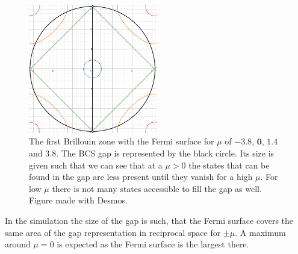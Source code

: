 \documentclass[..\main.tex]{subfile}
\begin{document}
\begin{figure}[H]
  \centering
  \includegraphics[width=0.5\textwidth]{Ressources/GapBrillouin.png}
  \caption{The first Brillouin zone with the Fermi surface for $\mu$ of \textcolor{Brillou1}{$\bm{-3.8}$}, \textcolor{Brillou2}{$\bm{0}$},
  \textcolor{Brillou3}{$\bm{1.4}$} and \textcolor{Brillou4}{$\bm{3.8}$}. The BCS gap is represented by the black circle. Its size is given such that 
  we can see that at a $\mu>0$ the states that can be found in the gap are less present until they vanish for a high $\mu$. For low $\mu$ there is
  not many states accessible to fill the gap as well. Figure made with Desmos.}
  \label{fig:Brillouin}
\end{figure}
In the simulation the size of the gap is such, that the Fermi surface 
covers the same area of the gap representation in reciprocal space for $\pm\mu$.
A maximum around $\mu=0$ is expected as the Fermi surface is the largest there.   
\end{document}
